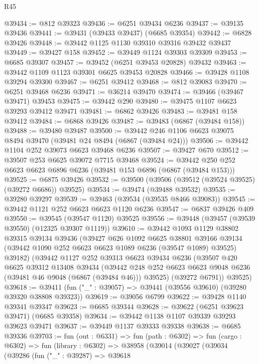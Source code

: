 \begin{lexlean}{R45}
\begin{coremodule}
{@39434 := @812 @39323
@39436 := @6251 @39434 @6236
@39437 := @39135 @39436
@39441 := @39431 (@39433 @39437) (@6685 @39354)
@39442 := @6828 @39426
@39448 := @39442 @1125 @1130 @39310 @39316 @39432 @39437
@39449 := @39427 @158
@39452 := @39449 @1124 @39303 @39309
@39453 := @6685 @39307
@39457 := @39452 (@6251 @39453 @20828) @39432
@39463 := @39442 @1109 @1123 @39301 @6625 @39453 @20828
@39466 := @39428 @1108 @39294 @39300
@39467 := @6251 @39412
@39468 := @812 @39083
@39470 := @6251 @39468 @6236
@39471 := @36214 @39470
@39474 := @39466 (@39467 @39471) @39453
@39475 := @39442 @290
@39480 := @39475 @1107 @6623 @39293 @39412 @39471
@39481 := @6862 @39426
@39483 := @39481 @158 @39412
@39484 := @6868 @39426
@39487 := @39483 (@6867 (@39484 @158))
@39488 := @39480 @39487
@39500 := @39442 @246 @1106 @6623 @39075 @8494 @39470 (@39481 @24 @8494 (@6867 (@39484 @24)))
@39506 := @39442 @1104 @252 @39073 @6623 @39468 @6236
@39507 := @39427 @670
@39512 := @39507 @253 @6625 @39072 @7715 @39468
@39524 := @39442 @250 @252 @6623 @6623 @6896 @6236 (@39481 @153 @6896 (@6867 (@39484 @153)))
@39525 := @6875 @39426
@39532 := @39500 (@39506 (@39512 (@39524 @39525) (@39272 @6686)) @39525)
@39534 := @39474 (@39488 @39532)
@39535 := @39280 @39297
@39539 := @39463 (@39534 (@39535 @8466 @39083))
@39545 := @39442 @1121 @252 @6623 @6623 @1120 @6236
@39547 := @6837 @39426 @409
@39550 := @39545 (@39547 @1120) @39525
@39556 := @39448 (@39457 (@39539 @39550) (@12325 @39307 @1119))
@39610 := @39442
    @1093
    @1129
    @38802
    @39315
    @39134
    @39436
    (@39427
      @626
      @1092
      @6625
      @38801
      @39166
      @39134
      (@39442 @1090 @252 @6623 @6623 @1089 @6236 (@39547 @1089) @39525)
      @39182)
    (@39442
      @1127
      @252
      @39313
      @6623
      @39434
      @6236
      (@39507
        @420
        @6625
        @39312
        @13408
        @39434
        (@39442 @248 @252 @6623 @6623 @9048 @6236 (@39481 @46 @9048 (@6867 (@39484 @46))) @39525)
        (@39272 @6791))
      @39525)
@39618 := @39411 (fun ("_" : @39057) => @39441 (@39556 @39610) (@39280 @39320 @38808 @39323))
@39619 := @39056 @6799
@39622 := @39428 @1140 @39341 @39347
@39623 := @6685 @39344
@39628 := @39622 (@6251 @39623 @39471) (@6685 @39358)
@39634 := @39442 @1138 @1107 @39339 @39293 @39623 @39471
@39637 := @39449 @1137 @39333 @39338
@39638 := @6685 @39336
@39703 := fun (out : @6331) =>
  fun (path : @6302) =>
  fun (cargo : @6302) =>
  fun (library : @6302) =>
  @38958
    (@39014
      (@39027
        (@39034
          (@39286
            (fun ("_" : @39287) =>
            @39618
}
\end{coremodule}
\end{lexlean}
